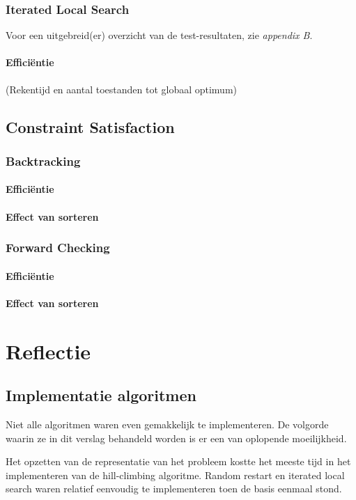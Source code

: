 \documentclass[]{report}
\begin{document}
\subsection{Iterated Local Search}
Voor een uitgebreid(er) overzicht van de test-resultaten, zie \textit{appendix B}.
\subsubsection{Effici\"{e}ntie}
(Rekentijd en aantal toestanden tot globaal optimum)
\section{Constraint Satisfaction}
\subsection{Backtracking}
\subsubsection{Effici\"{e}ntie}
\subsubsection{Effect van sorteren}
\subsection{Forward Checking}
\subsubsection{Effici\"{e}ntie}
\subsubsection{Effect van sorteren}

\chapter{Reflectie}
\section{Implementatie algoritmen}
Niet alle algoritmen waren even gemakkelijk te implementeren. De volgorde waarin ze in dit verslag behandeld worden is er een van oplopende moeilijkheid. 

Het opzetten van de representatie van het probleem kostte het meeste tijd in het implementeren van de hill-climbing algoritme. Random restart en iterated local search waren relatief eenvoudig te implementeren toen de basis eenmaal stond.
\end{document}
